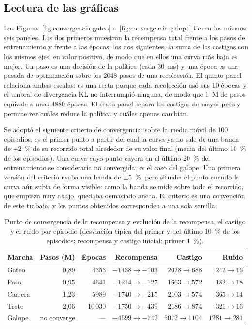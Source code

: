\subsection{Lectura de las gráficas}

Las Figuras~\ref{fig:convergencia-gateo} a~\ref{fig:convergencia-galope} tienen los mismos
seis paneles. Los dos primeros muestran la recompensa total frente a los pasos de
entrenamiento y frente a las épocas; los dos siguientes, la suma de los castigos con
los mismos ejes, en valor positivo, de modo que en ellos una curva más baja es mejor. Un
paso es una decisión de la política (cada 30~ms) y una época es una pasada de
optimización sobre los 2048 pasos de una recolección. El quinto panel relaciona ambas
escalas: es una recta porque cada recolección usó sus 10 épocas y el umbral de divergencia
KL no interrumpió ninguna, de modo que 1~M de pasos equivale a unas 4880 épocas. El sexto
panel separa los castigos de mayor peso y permite ver cuáles reduce la política y cuáles
apenas cambian.

Se adoptó el siguiente criterio de convergencia: sobre la media móvil de 100
episodios, es el primer punto a partir del cual la curva ya no sale de una banda de
$\pm2$~\% de su recorrido total alrededor de su valor final (media del último 10~\% de
los episodios). Una curva cuyo punto cayera en el último 20~\% del entrenamiento se
consideraría no convergida; es el caso del galope. Una primera versión del criterio usaba una
banda de $\pm5$~\%, pero situaba el punto cuando la curva aún subía de forma visible: como
la banda se mide sobre todo el recorrido, que empieza muy abajo, quedaba demasiado ancha.
El criterio es una convención de este trabajo, y los puntos obtenidos corresponden a una sola semilla.

\begin{table}[H]
\centering
\caption{Punto de convergencia de la recompensa y evolución de la recompensa, el castigo y el ruido por episodio (desviación típica del primer y del último 10~\% de los episodios; recompensa y castigo inicial: primer 1~\%).}
\label{tab:convergencia-marchas}
\small
\begin{tabular}{lrrrrr}
\toprule
Marcha & Pasos (M) & Épocas & Recompensa & Castigo & Ruido \\
\midrule
Gateo & 0,89 & 4353 & $-1438 \to -103$ & $2028 \to 688$ & $242 \to 16$ \\
Paso & 0,95 & 4641 & $-1214 \to -127$ & $1663 \to 572$ & $182 \to 18$ \\
Carrera & 1,23 & 5989 & $-1740 \to -215$ & $2103 \to 574$ & $365 \to 14$ \\
Trote & 2,06 & 10\,030 & $-1750 \to -439$ & $2186 \to 874$ & $321 \to 16$ \\
Galope & no converge & --- & $-4699 \to -742$ & $5072 \to 1104$ & $1281 \to 281$ \\
\bottomrule
\end{tabular}
\end{table}

